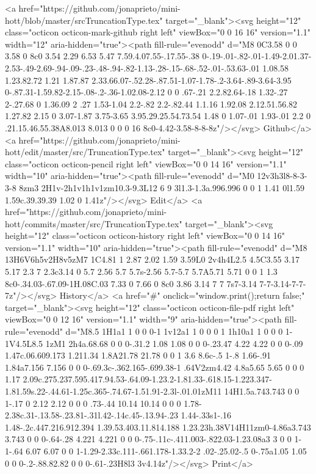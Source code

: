       <a href="https://github.com/jonaprieto/mini-hott/blob/master/srcTruncationType.tex" target="_blank"><svg height="12" class="octicon octicon-mark-github right left" viewBox="0 0 16 16" version="1.1" width="12" aria-hidden="true"><path fill-rule="evenodd" d="M8 0C3.58 0 0 3.58 0 8c0 3.54 2.29 6.53 5.47 7.59.4.07.55-.17.55-.38 0-.19-.01-.82-.01-1.49-2.01.37-2.53-.49-2.69-.94-.09-.23-.48-.94-.82-1.13-.28-.15-.68-.52-.01-.53.63-.01 1.08.58 1.23.82.72 1.21 1.87.87 2.33.66.07-.52.28-.87.51-1.07-1.78-.2-3.64-.89-3.64-3.95 0-.87.31-1.59.82-2.15-.08-.2-.36-1.02.08-2.12 0 0 .67-.21 2.2.82.64-.18 1.32-.27 2-.27.68 0 1.36.09 2 .27 1.53-1.04 2.2-.82 2.2-.82.44 1.1.16 1.92.08 2.12.51.56.82 1.27.82 2.15 0 3.07-1.87 3.75-3.65 3.95.29.25.54.73.54 1.48 0 1.07-.01 1.93-.01 2.2 0 .21.15.46.55.38A8.013 8.013 0 0 0 16 8c0-4.42-3.58-8-8-8z"/></svg> Github</a>
      <a href="https://github.com/jonaprieto/mini-hott/edit/master/src/TruncationType.tex" target="_blank"><svg height="12" class="octicon octicon-pencil right left" viewBox="0 0 14 16" version="1.1" width="10" aria-hidden="true"><path fill-rule="evenodd" d="M0 12v3h3l8-8-3-3-8 8zm3 2H1v-2h1v1h1v1zm10.3-9.3L12 6 9 3l1.3-1.3a.996.996 0 0 1 1.41 0l1.59 1.59c.39.39.39 1.02 0 1.41z"/></svg> Edit</a>
      <a href="https://github.com/jonaprieto/mini-hott/commits/master/src/TruncationType.tex" target="_blank"><svg height="12" class="octicon octicon-history right left" viewBox="0 0 14 16" version="1.1" width="10" aria-hidden="true"><path fill-rule="evenodd" d="M8 13H6V6h5v2H8v5zM7 1C4.81 1 2.87 2.02 1.59 3.59L0 2v4h4L2.5 4.5C3.55 3.17 5.17 2.3 7 2.3c3.14 0 5.7 2.56 5.7 5.7s-2.56 5.7-5.7 5.7A5.71 5.71 0 0 1 1.3 8c0-.34.03-.67.09-1H.08C.03 7.33 0 7.66 0 8c0 3.86 3.14 7 7 7s7-3.14 7-7-3.14-7-7-7z"/></svg> History</a>
      <a  href="#" onclick="window.print();return false;" target="_blank"><svg height="12" class="octicon octicon-file-pdf right left" viewBox="0 0 12 16" version="1.1" width="9" aria-hidden="true"><path fill-rule="evenodd" d="M8.5 1H1a1 1 0 0 0-1 1v12a1 1 0 0 0 1 1h10a1 1 0 0 0 1-1V4.5L8.5 1zM1 2h4a.68.68 0 0 0-.31.2 1.08 1.08 0 0 0-.23.47 4.22 4.22 0 0 0-.09 1.47c.06.609.173 1.211.34 1.8A21.78 21.78 0 0 1 3.6 8.6c-.5 1-.8 1.66-.91 1.84a7.156 7.156 0 0 0-.69.3c-.362.165-.699.38-1 .64V2zm4.42 4.8a5.65 5.65 0 0 0 1.17 2.09c.275.237.595.417.94.53-.64.09-1.23.2-1.81.33-.618.15-1.223.347-1.81.59s.22-.44.61-1.25c.365-.74.67-1.51.91-2.3l-.01.01zM11 14H1.5a.743.743 0 0 1-.17 0 2.12 2.12 0 0 0 .73-.44 10.14 10.14 0 0 0 1.78-2.38c.31-.13.58-.23.81-.31l.42-.14c.45-.13.94-.23 1.44-.33s1-.16 1.48-.2c.447.216.912.394 1.39.53.403.11.814.188 1.23.23h.38V14H11zm0-4.86a3.743 3.743 0 0 0-.64-.28 4.221 4.221 0 0 0-.75-.11c-.411.003-.822.03-1.23.08a3 3 0 0 1-1-.64 6.07 6.07 0 0 1-1.29-2.33c.111-.661.178-1.33.2-2 .02-.25.02-.5 0-.75a1.05 1.05 0 0 0-.2-.88.82.82 0 0 0-.61-.23H8l3 3v4.14z"/></svg> Print</a>
